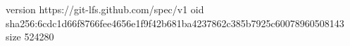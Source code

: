 version https://git-lfs.github.com/spec/v1
oid sha256:6cdc1d66f8766fee4656e1f9f42b681ba4237862c385b7925c60078960508143
size 524280

